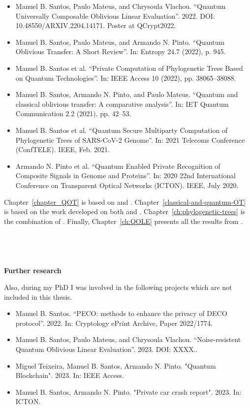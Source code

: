 \begin{itemize}
	\item\cite{SMV22} Manuel B. Santos, Paulo Mateus, and Chrysoula Vlachou. “Quantum Universally
Composable Oblivious Linear Evaluation”. 2022. DOI: 10.48550/ARXIV.2204.14171. Poster at QCrypt2022.	
	
	\item\cite{SMP22} Manuel B. Santos, Paulo Mateus, and Armando N. Pinto. “Quantum Oblivious Transfer:
A Short Review”. In: Entropy 24.7 (2022), p. 945.

	\item\cite{SGPM22} Manuel B. Santos et al. “Private Computation of Phylogenetic Trees Based on Quantum
Technologies”. In: IEEE Access 10 (2022), pp. 38065–38088.

	\item\cite{SPM21} Manuel B. Santos, Armando N. Pinto, and Paulo Mateus. “Quantum and classical
oblivious transfer: A comparative analysis”. In: IET Quantum Communication 2.2 (2021), pp. 42–53.

	\item\cite{SGPM21} Manuel B. Santos et al. “Quantum Secure Multiparty Computation of Phylogenetic Trees of SARS-CoV-2 Genome”. In: 2021 Telecoms Conference (ConfTELE). IEEE, Feb. 2021.

    \item\cite{POS+20} Armando N. Pinto et al. “Quantum Enabled Private Recognition of Composite Signals
in Genome and Proteins”. In: 2020 22nd International Conference on Transparent Optical
Networks (ICTON). IEEE, July 2020. 
\end{itemize}

Chapter~\ref{chapter_QOT} is based on \cite{SMP22} and \cite{SGPM22}. Chapter~\ref{classical-and-quantum-OT} is based on the work developed on both \cite{SPM21} and \cite{SGPM22}. Chapter~\ref{ch:phylogenetic-trees} is the combination of \cite{SGPM22, SGPM21, POS+20}. Finally, Chapter~\ref{ch:QOLE} presents all the results from \cite{SMV22}. 

\

\

\noindent\textbf{Further research}

\noindent Also, during my PhD I was involved in the following projects which are not included in this thesis.

\begin{itemize}
	\item \cite{S22} Manuel B. Santos. “PECO: methods to enhance the privacy of DECO protocol”. 2022. In: Cryptology ePrint Archive, Paper 2022/1774.
	\item \cite{SMV23} Manuel B. Santos, Paulo Mateus, and Chrysoula Vlachou. “Noise-resistent Quantum Oblivious Linear Evaluation”. 2023. DOI: XXXX..
	\item \cite{TSP23} Miguel Teixeira, Manuel B. Santos, Armando N. Pinto. "Quantum Blockchain". 2023. In: IEEE Access.
	\item \cite{SP23} Manuel B. Santos, Armando N. Pinto. "Private car crash report". 2023. In: ICTON.
\end{itemize}


